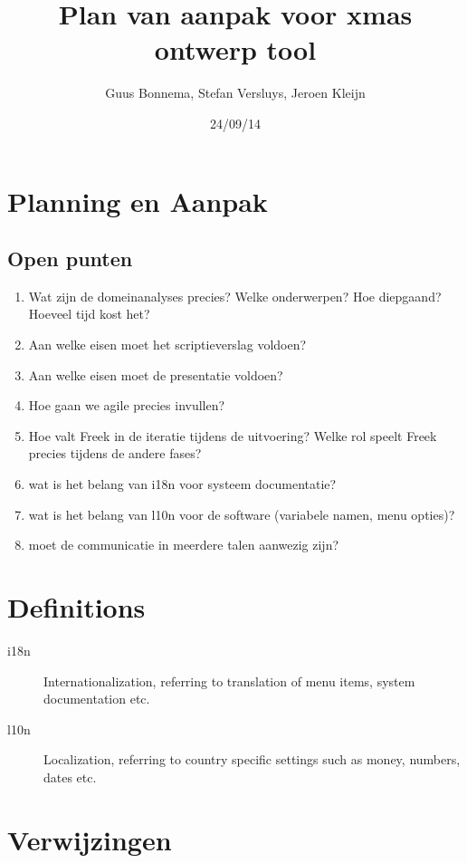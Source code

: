 \documentclass[a4paper,11pt,twoside,draft]{article}
\author{Guus Bonnema, Stefan Versluys, Jeroen Kleijn}
\date{24/09/14}
\title{Plan van aanpak voor xmas ontwerp tool}
\begin{document}





\section{Planning en Aanpak}





\subsection{Open punten}

\begin{enumerate}
 \item Wat zijn de domeinanalyses precies? Welke onderwerpen? Hoe diepgaand? Hoeveel tijd kost het?
 \item Aan welke eisen moet het scriptieverslag voldoen?
 \item Aan welke eisen moet de presentatie voldoen?
 \item Hoe gaan we agile precies invullen?
 \item Hoe valt Freek in de iteratie tijdens de uitvoering? Welke rol speelt Freek precies tijdens de andere fases?
 \item wat is het belang van i18n voor systeem documentatie?
 \item wat is het belang van l10n voor de software (variabele namen, menu opties)?
 \item moet de communicatie in meerdere talen aanwezig zijn?
\end{enumerate}


\appendix
\section{Definitions}

\begin{description}
 \item[i18n] Internationalization, referring to translation of menu items, system documentation etc.
 \item[l10n] Localization, referring to country specific settings such as money, numbers, dates etc.
\end{description}
\section{Verwijzingen}


\end{document}
